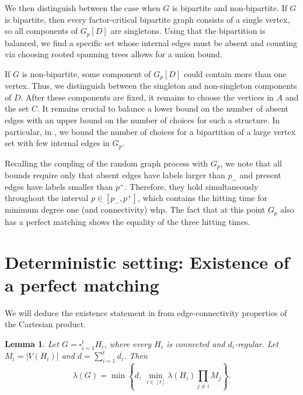 \documentclass[10pt,a4paper]{article}
\newtheorem{lemma}[thm]{Lemma}
\begin{document}
We then distinguish between the case when $G$ is bipartite and non-bipartite. If $G$ is bipartite, then every factor-critical bipartite graph consists of a single vertex, so all components of $G_p[D]$ are singletons. Using that the bipartition is balanced, we find a specific set whose internal edges must be absent and counting via choosing rooted spanning trees allows for a union bound.

If $G$ is non-bipartite, some component of $G_p[D]$ could contain more than one vertex. Thus, we distinguish between the singleton and non-singleton components of  $D$. After these components are fixed, it remains to choose the vertices in $A$ and the set $C$. %
It remains crucial to balance a lower bound on the number of absent edges with an upper bound on the number of choices for such a structure. In particular, in , we bound the number of choices for a bipartition of a large vertex set with few internal edges in $G_p$.

Recalling the coupling of the random graph process with $G_p$, we note that all bounds require only that absent edges have labels larger than $p_-$ and present edges have labels smaller than $p^+$. Therefore, they hold simultaneously throughout the interval $p \in [p_-, p^+]$, which contains the hitting time for minimum degree one (and connectivity) whp. The fact that at this point $G_p$ also has a perfect matching shows the equality of the three hitting times. 

\section{Deterministic setting: Existence of a perfect matching} \label{sec:deterministic-matching}

We will deduce the existence statement in  from edge-connectivity properties of the Cartesian product.

\begin{lemma}\label{lem:product-connectivity}
Let $G=\square_{i=1}^t H_i$, where every $H_i$ is connected and $d_i$-regular.
Let $M_i=|V(H_i)|$ and $d=\sum_{i=1}^t d_i$.
Then
\[
  \lambda(G)=
  \min\left\{d,\ \min_{i\in[t]}\lambda(H_i)\prod_{j\ne i}M_j\right\}.
\]
\end{lemma}
\end{document}
